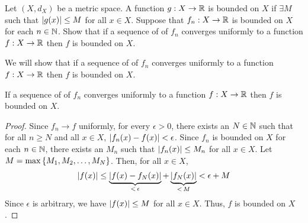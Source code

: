 \begin{problem}
  Let $(X, d_X)$ be a metric space.
  A function $g : X \to \mathbb{R}$ is bounded on $X$
  if $\exists M$ such that $\lvert g(x)\rvert \leq M$ for all $x \in X$.
  Suppose that $f_n : X \to \mathbb{R}$ is bounded on $X$ for each $n \in \mathbb{N}$.
  Show that if a sequence of of $f_n$ converges uniformly
  to a function $f : X \to \mathbb{R}$ then $f$ is bounded on $X$.
\end{problem}

\begin{answer}
  We will show that if a sequence of of $f_n$ converges uniformly
  to a function $f : X \to \mathbb{R}$ then $f$ is bounded on $X$.

  \begin{claim}
    If a sequence of of $f_n$ converges uniformly
    to a function $f : X \to \mathbb{R}$ then $f$ is bounded on $X$.
    \begin{proof}
      Since $f_n \to f$ uniformly, for every $\epsilon > 0$,
      there exists an $N \in \mathbb{N}$ such that for all $n \geq N$ and all $x \in X$,
      $\lvert f_n(x) - f(x)\rvert < \epsilon$.
      Since $f_n$ is bounded on $X$ for each $n \in \mathbb{N}$,
      there exists an $M_n$ such that $\lvert f_n(x)\rvert \leq M_n$ for all $x \in X$.
      Let $M = \max \left\{M_1, M_2, \ldots, M_N\right\}$.
      Then, for all $x \in X$,
      \begin{align*}
        \lvert f(x)\rvert \leq \underbrace{\lvert f(x) - f_N(x)\rvert}_{<\, \epsilon}
        + \underbrace{\lvert f_N(x)\rvert}_{<\, M} < \epsilon + M
      \end{align*}
      Since $\epsilon$ is arbitrary, we have $\lvert f(x)\rvert \leq M$ for all $x \in X$.
      Thus, $f$ is bounded on $X$.
    \end{proof}
  \end{claim}
\end{answer}
